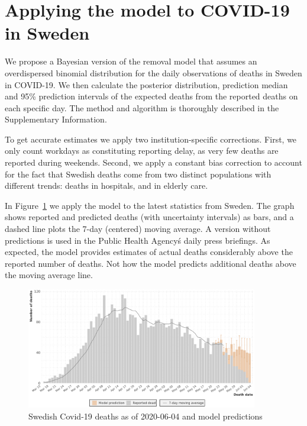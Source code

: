 \documentclass[a4paper,11pth]{article}
\begin{document}
\section{Applying the model to COVID-19 in Sweden}
We propose a Bayesian version of the removal model that assumes an overdispersed binomial distribution for the daily observations of deaths in Sweden in COVID-19. We then calculate the posterior distribution, prediction median and 95\% prediction intervals of the expected deaths from the reported deaths on each specific day. The method and algorithm is thoroughly described in the Supplementary Information.

To get accurate estimates we apply two institution-specific corrections. First, we only count workdays as constituting reporting delay, as very few deaths are reported during weekends. Second, we apply a constant bias correction to account for the fact that Swedish deaths come from two distinct populations with different trends: deaths in hospitals, and in elderly care.

In Figure~\ref{fig:latest_prediction} we apply the model to the latest statistics from Sweden. The graph shows reported and predicted deaths (with uncertainty intervals) as bars, and a dashed line plots the 7-day (centered) moving average. A version without predictions is used in the Public Health Agency\'s daily press briefings. As expected, the model provides estimates of actual deaths considerably above the reported number of deaths. Not how the model predicts additional deaths above the moving average line.

\begin{figure}
    \centering
    \includegraphics[width=0.9\textwidth]{plots/latest_prediction}
    \caption{Swedish Covid-19 deaths as of 2020-06-04 and model predictions}
    \label{fig:latest_prediction}
\end{figure}
\end{document}
